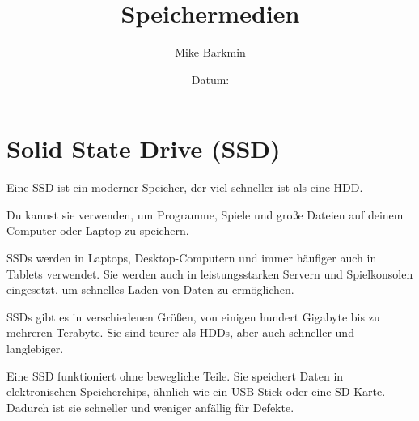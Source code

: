 \documentclass[a4paper,14pt]{scrartcl}
\title{Speichermedien}
\author{Mike Barkmin}
\date{Datum: \hspace{1.5cm}}
\begin{document}
\section*{ Solid State Drive (SSD)}

Eine SSD ist ein moderner Speicher, der viel schneller ist als eine HDD. 

Du kannst sie verwenden, um Programme, Spiele und große Dateien auf deinem Computer oder Laptop zu speichern. 

SSDs werden in Laptops, Desktop-Computern und immer häufiger auch in Tablets verwendet. Sie werden auch in leistungsstarken Servern und Spielkonsolen eingesetzt, um schnelles Laden von Daten zu ermöglichen. 

SSDs gibt es in verschiedenen Größen, von einigen hundert Gigabyte bis zu mehreren Terabyte. Sie sind teurer als HDDs, aber auch schneller und langlebiger.

Eine SSD funktioniert ohne bewegliche Teile. Sie speichert Daten in elektronischen Speicherchips, ähnlich wie ein USB-Stick oder eine SD-Karte. Dadurch ist sie schneller und weniger anfällig für Defekte.
\end{document}
